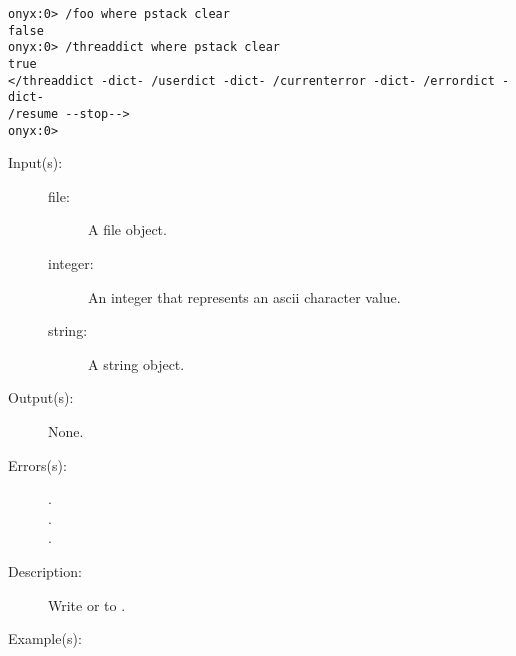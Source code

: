 \begin{description}
\begin{description}
\begin{verbatim}
onyx:0> /foo where pstack clear
false
onyx:0> /threaddict where pstack clear
true
</threaddict -dict- /userdict -dict- /currenterror -dict- /errordict -dict-
/resume --stop-->
onyx:0>
		\end{verbatim}
	\end{description}
\label{systemdict:write}
\item[{\onyxop{file integer/string}{write}{--}}: ]
	\begin{description}\item[]
	\item[Input(s): ]
		\begin{description}\item[]
		\item[file: ]
			A file object.
		\item[integer: ]
			An integer that represents an ascii character value.
		\item[string: ]
			A string object.
		\end{description}
	\item[Output(s): ] None.
	\item[Errors(s): ]
		\begin{description}\item[]
		\item[.]
		\item[.]
		\item[.]
		\end{description}
	\item[Description: ]
		Write  or  to .
	\item[Example(s): ]\begin{verbatim}


\end{verbatim}
\end{description}
\end{description}
